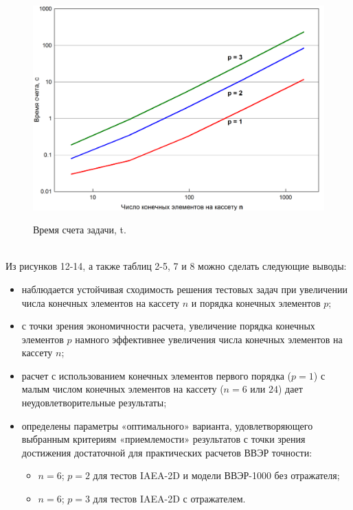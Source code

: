 \begin{figure}[H]
	\includegraphics[width=0.9\linewidth]{Time.png}\\
	\caption{\label{image:canonsummary}Время счета задачи, t.}
	\label{ris:graph1}
\end{figure}
$\phantom{123}$
\\
Из рисунков 12-14, а также таблиц 2-5, 7 и 8 можно сделать следующие выводы: 
\begin{itemize}\itemsep1pt \parskip0pt 
\item наблюдается устойчивая сходимость решения тестовых задач при увеличении числа конечных элементов на кассету $n$ и порядка конечных элементов $p$;
\item с точки зрения экономичности расчета, увеличение порядка конечных элементов $p$ намного эффективнее увеличения числа конечных элементов на кассету $n$;
\item расчет с использованием конечных элементов первого порядка ($p = 1$) с малым числом конечных элементов на кассету ($n = 6$ или $24$) дает неудовлетворительные результаты; 
\item определены параметры «оптимального» варианта, удовлетворяющего выбранным критериям «приемлемости» результатов с точки зрения достижения достаточной для практических расчетов ВВЭР точности:
\begin{itemize}\itemsep1pt \parskip0pt 
\item $n = 6$; $p = 2$ для тестов IAEA-2D и модели ВВЭР-1000 без отражателя;
\item $n = 6$; $p = 3$ для тестов IAEA-2D с отражателем.
\end{itemize}
\end{itemize}
$\phantom{123}$
